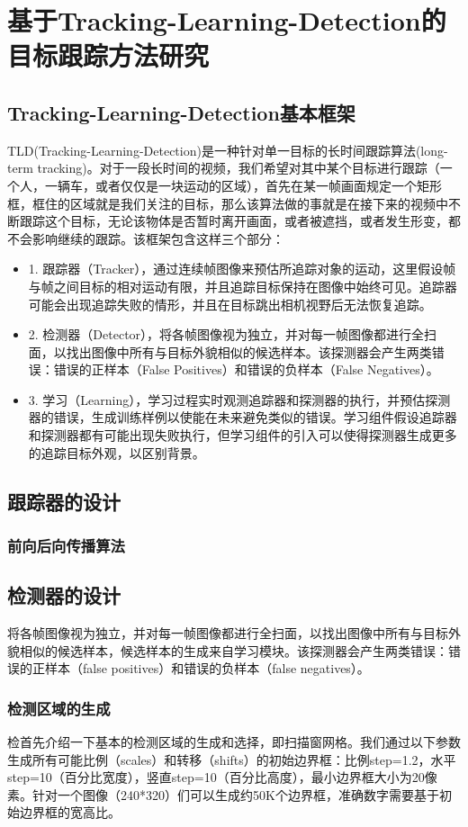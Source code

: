 \section{基于Tracking-Learning-Detection的目标跟踪方法研究}
\subsection{Tracking-Learning-Detection基本框架}
TLD(Tracking-Learning-Detection)是一种针对单一目标的长时间跟踪算法(long-term tracking)。对于一段长时间的视频，我们希望对其中某个目标进行跟踪（一个人，一辆车，或者仅仅是一块运动的区域），首先在某一帧画面规定一个矩形框，框住的区域就是我们关注的目标，那么该算法做的事就是在接下来的视频中不断跟踪这个目标，无论该物体是否暂时离开画面，或者被遮挡，或者发生形变，都不会影响继续的跟踪。该框架包含这样三个部分：
\begin{itemize}
	\item 1. 跟踪器（Tracker），通过连续帧图像来预估所追踪对象的运动，这里假设帧与帧之间目标的相对运动有限，并且追踪目标保持在图像中始终可见。追踪器可能会出现追踪失败的情形，并且在目标跳出相机视野后无法恢复追踪。
	\item 2. 检测器（Detector），将各帧图像视为独立，并对每一帧图像都进行全扫面，以找出图像中所有与目标外貌相似的候选样本。该探测器会产生两类错误：错误的正样本（False Positives）和错误的负样本（False Negatives）。
	\item 3. 学习（Learning），学习过程实时观测追踪器和探测器的执行，并预估探测器的错误，生成训练样例以使能在未来避免类似的错误。学习组件假设追踪器和探测器都有可能出现失败执行，但学习组件的引入可以使得探测器生成更多的追踪目标外观，以区别背景。
\end{itemize}
\subsection{跟踪器的设计}
\subsubsection{前向后向传播算法}

\subsection{检测器的设计}
将各帧图像视为独立，并对每一帧图像都进行全扫面，以找出图像中所有与目标外貌相似的候选样本，候选样本的生成来自学习模块。该探测器会产生两类错误：错误的正样本（false positives）和错误的负样本（false negatives）。

\subsubsection{检测区域的生成}
检首先介绍一下基本的检测区域的生成和选择，即扫描窗网格。我们通过以下参数生成所有可能比例（scales）和转移（shifts）的初始边界框：比例step=1.2，水平step=10（百分比宽度），竖直step=10（百分比高度），最小边界框大小为20像素。针对一个图像（240*320）们可以生成约50K个边界框，准确数字需要基于初始边界框的宽高比。

